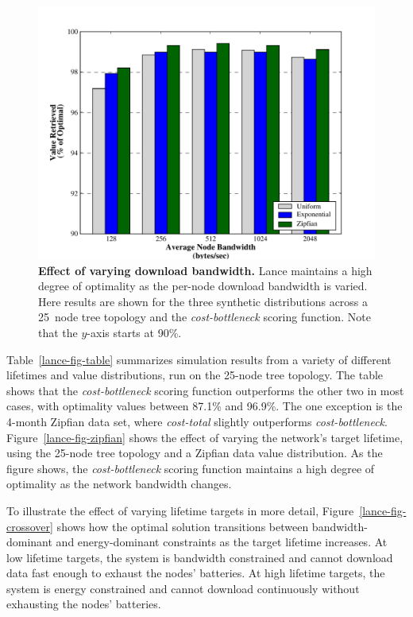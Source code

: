 \begin{figure}[t]
\begin{center}
\includegraphics[width=1.0\hsize]{./4-lance/figs/speeds.pdf}
\end{center}

\caption{\textbf{Effect of varying download bandwidth.} Lance maintains a
high degree of optimality as the per-node download bandwidth is varied. Here
results are shown for the three synthetic distributions across a 25~node tree
topology and the \textit{cost-bottleneck} scoring function. Note that the
$y$-axis starts at 90\%.}

\label{lance-fig-speeds}
\end{figure}


Table~\ref{lance-fig-table} summarizes simulation results from a variety of
different lifetimes and value distributions, run on the 25-node tree
topology. The table shows that the \textit{cost-bottleneck} scoring function
outperforms the other two in most cases, with optimality values between
87.1\% and 96.9\%. The one exception is the 4-month Zipfian data set, where
\textit{cost-total} slightly outperforms \textit{cost-bottleneck}.
Figure~\ref{lance-fig-zipfian} shows the effect of varying the network's
target lifetime, using the 25-node tree topology and a Zipfian data value
distribution. As the figure shows, the \textit{cost-bottleneck} scoring
function maintains a high degree of optimality as the network bandwidth
changes.

To illustrate the effect of varying lifetime targets in more detail,
Figure~\ref{lance-fig-crossover} shows how the optimal solution transitions
between bandwidth-dominant and energy-dominant constraints as the target
lifetime increases. At low lifetime targets, the system is bandwidth
constrained and cannot download data fast enough to exhaust the nodes'
batteries. At high lifetime targets, the system is energy constrained and
cannot download continuously without exhausting the nodes' batteries.

